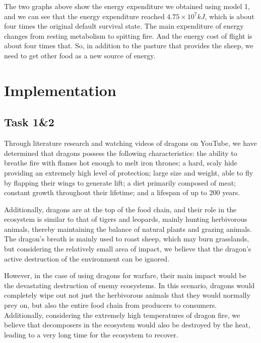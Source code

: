 \documentclass[12pt]{article}  %
\begin{document}
The two graphs above show the energy expenditure we obtained using model 1, and we can see that the energy expenditure reached $4.75\times10^7kJ$, which is about four times the original default survival state. The main expenditure of energy changes from resting metabolism to spitting fire. And the energy cost of flight is about four times that. So, in addition to the pasture that provides the sheep, we need to get other food as a new source of energy.

\section{Implementation}
\vspace{-0.3cm}



\subsection{Task 1\&2}
\vspace{-0.3cm}
Through literature research and watching videos of dragons on YouTube, we have determined that dragons possess the following characteristics: the ability to breathe fire with flames hot enough to melt iron thrones; a hard, scaly hide providing an extremely high level of protection; large size and weight, able to fly by flapping their wings to generate lift; a diet primarily composed of meat; constant growth throughout their lifetime; and a lifespan of up to 200 years.

Additionally, dragons are at the top of the food chain, and their role in the ecosystem is similar to that of tigers and leopards, mainly hunting herbivorous animals, thereby maintaining the balance of natural plants and grazing animals. The dragon's breath is mainly used to roast sheep, which may burn grasslands, but considering the relatively small area of impact, we believe that the dragon's active destruction of the environment can be ignored.

However, in the case of using dragons for warfare, their main impact would be the devastating destruction of enemy ecosystems. In this scenario, dragons would completely wipe out not just the herbivorous animals that they would normally prey on, but also the entire food chain from producers to consumers. Additionally, considering the extremely high temperatures of dragon fire, we believe that decomposers in the ecosystem would also be destroyed by the heat, leading to a very long time for the ecosystem to recover.
\end{document}

